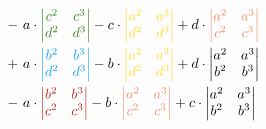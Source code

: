 \documentclass[main.tex]{subfiles}
\begin{document}
\begin{align*}
%
    -&\ 
    a \cdot \textcolor{OliveGreen}{\begin{vmatrix}
        c^2 & c^3 \\
        d^2 & d^3 \\
    \end{vmatrix}}
    - c \cdot
    \textcolor{Goldenrod}{\begin{vmatrix}
        a^2 & a^3 \\
        d^2 & d^3 \\
    \end{vmatrix}}
    + d \cdot
    \textcolor{Melon}{\begin{vmatrix}
        a^2 & a^3 \\
        c^2 & c^3 \\
    \end{vmatrix}}\\
%
    +&\ 
    a \cdot \textcolor{Cerulean}{\begin{vmatrix}
        b^2 & b^3 \\
        d^2 & d^3 \\
    \end{vmatrix}}
    - b \cdot
    \textcolor{Goldenrod}{\begin{vmatrix}
        a^2 & a^3 \\
        d^2 & d^3 \\
    \end{vmatrix}}
    + d \cdot
    \begin{vmatrix}
        a^2 & a^3 \\
        b^2 & b^3 \\
    \end{vmatrix}\\
%
    -&\ 
    a \cdot \textcolor{BrickRed}{\begin{vmatrix}
        b^2 & b^3 \\
        c^2 & c^3 \\
    \end{vmatrix}}
    - b \cdot
    \textcolor{Melon}{\begin{vmatrix}
        a^2 & a^3 \\
        c^2 & c^3 \\
    \end{vmatrix}}
    + c \cdot
    \begin{vmatrix}
        a^2 & a^3 \\
        b^2 & b^3 \\
    \end{vmatrix}\\

\end{align*}
\end{document}
